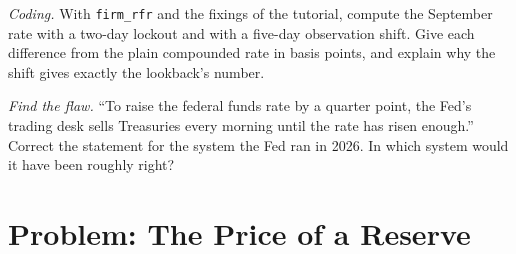 \begin{exercise}[$\star\star\star$]\label{exo:m2:central-banks-and-the-short-rate:7}
\emph{Coding.} With \texttt{firm\_rfr} and the fixings of the tutorial,
compute the September rate with a two-day lockout and with a five-day
observation shift. Give each difference from the plain compounded rate in
basis points, and explain why the shift gives exactly the lookback's number.
\end{exercise}

\begin{exercise}[$\star\star\star$]\label{exo:m2:central-banks-and-the-short-rate:8}
\emph{Find the flaw.} ``To raise the federal funds rate by a quarter point,
the Fed's trading desk sells Treasuries every morning until the rate has
risen enough.'' Correct the statement for the system the Fed ran in 2026.
In which system would it have been roughly right?
\end{exercise}

\section{Problem: The Price of a Reserve}

